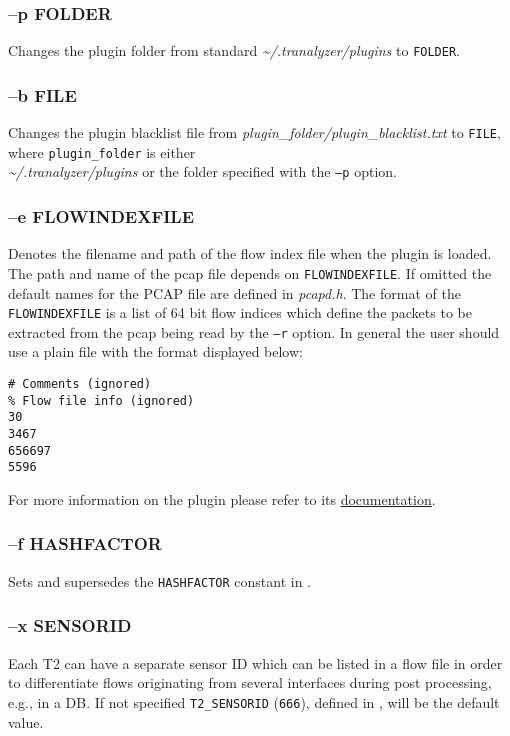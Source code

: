 \subsubsection{--p FOLDER}
Changes the plugin folder from standard {\em \textasciitilde{}/.tranalyzer/plugins} to {\tt FOLDER}.

\subsubsection{--b FILE}
Changes the plugin blacklist file from {\em plugin\_folder/plugin\_blacklist.txt} to {\tt FILE}, where {\tt plugin\_folder} is either\\
{\em\textasciitilde{}/.tranalyzer/plugins} or the folder specified with the {\tt --p} option.

\subsubsection{--e FLOWINDEXFILE}
Denotes the filename and path of the flow index file when the  plugin is loaded.
The path and name of the pcap file depends on {\tt FLOWINDEXFILE}.
If omitted the default names for the PCAP file are defined in {\em pcapd.h}. The format of the {\tt FLOWINDEXFILE} is a list of 64 bit flow indices which define the packets to be extracted from the pcap being read by the {\tt --r} option.
In general the user should use a plain file with the format displayed below:

\begin{scriptsize}
\begin{lstlisting}
# Comments (ignored)
% Flow file info (ignored)
30
3467
656697
5596
\end{lstlisting}
\end{scriptsize}

For more information on the  plugin please refer to its \href{../../pcapd/doc/pcapd.pdf}{documentation}.

\subsubsection{--f HASHFACTOR}\label{s:foption}
Sets and supersedes the {\tt HASHFACTOR} constant in .

\subsubsection{--x SENSORID}
Each T2 can have a separate sensor ID which can be listed in a flow file in order to differentiate flows
originating from several interfaces during post processing, e.g., in a DB. If not specified {\tt T2\_SENSORID} ({\tt 666}), defined in , will be the default value.

